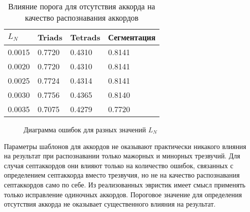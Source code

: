 \begin{table} [htbp]
  \centering
  \parbox{15cm}{\caption{Влияние порога для отсутствия аккорда на
  качество распознавания аккордов} \label{TLN}}
  \begin{tabular}{|l|l|l|l|}
  \hline
  $L_N$ & Triads & Tetrads & Сегментация \\
  \hline
  0.0015 & 0.7720 & 0.4310 & 0.8141 \\
  0.0020 & 0.7720 & 0.4310 & 0.8141 \\
  0.0025 & 0.7724 & 0.4314 & 0.8141 \\
  0.0030 & 0.7756 & 0.4365 & 0.8140 \\
  0.0035 & 0.7075 & 0.4279 & 0.7720 \\
  \hline
  \end{tabular}
\end{table}

\begin{figure}[htbp]
  \begin{minipage}[h]{0.49\linewidth}
  \end{minipage}
  \hfill
  \begin{minipage}[h]{0.49\linewidth}
  \end{minipage}
  \caption{Диаграмма ошибок для разных значений $L_N$}
  \label{img:noChordness}
\end{figure}


\medskip

Параметры шаблонов для аккордов не оказывают практически никакого влияния на
результат при распознавании только мажорных и минорных трезвучий. Для случая
септаккордов они влияют только на количество ошибок, связанных с определением
септаккорда вместо трезвучия, но не на качество распознавания септаккордов само
по себе. Из реализованных эвристик имеет смысл применять только исправление
одиночных аккордов. Пороговое значение для определения отсутствия аккорда не
оказывает существенного влияния на результат.


